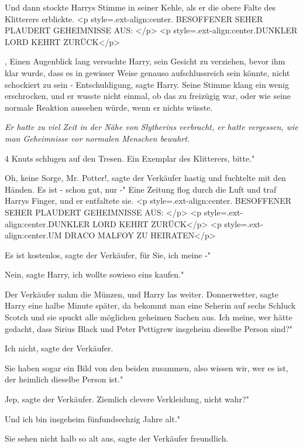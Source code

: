 Und dann stockte Harrys Stimme in seiner Kehle, als er die obere Falte des
Klitterers erblickte. <p style=\grqq{}.ext-align:center\grqq{}. BESOFFENER SEHER
PLAUDERT GEHEIMNISSE AUS: </p> <p style=\grqq{}.ext-align:center\grqq{}.DUNKLER
LORD KEHRT ZURÜCK</p>

, Einen Augenblick lang versuchte Harry, sein Gesicht zu verziehen, bevor ihm
klar wurde, dass es in gewisser Weise genauso aufschlussreich sein könnte, nicht
schockiert zu sein - \glqq Entschuldigung\grqq{}, sagte Harry. Seine Stimme
klang ein wenig erschrocken, und er wusste nicht einmal, ob das zu freizügig
war, oder wie seine normale Reaktion aussehen würde, wenn er nichts wüsste.

\emph{ Er hatte zu viel Zeit in der Nähe von Slytherins verbracht, er hatte vergessen, wie man Geheimnisse vor normalen Menschen bewahrt.}

4 Knuts schlugen auf den Tresen. \glqq Ein Exemplar des Klitterers, bitte."

\glqq Oh, keine Sorge, Mr. Potter!\grqq{}, sagte der Verkäufer hastig und
fuchtelte mit den Händen. \glqq Es ist - schon gut, nur -" Eine Zeitung flog
durch die Luft und traf Harrys Finger, und er entfaltete sie. <p
style=\grqq{}.ext-align:center\grqq{}. BESOFFENER SEHER PLAUDERT GEHEIMNISSE
AUS: </p> <p style=\grqq{}.ext-align:center\grqq{}.DUNKLER LORD KEHRT ZURÜCK</p>
<p style=\grqq{}.ext-align:center\grqq{}.UM DRACO MALFOY ZU HEIRATEN</p>

\glqq Es ist kostenlos\grqq{}, sagte der Verkäufer, \glqq für Sie, ich meine -"

\glqq Nein\grqq{}, sagte Harry, \glqq ich wollte sowieso eins kaufen."

Der Verkäufer nahm die Münzen, und Harry las weiter. \glqq Donnerwetter\grqq{},
sagte Harry eine halbe Minute später, \glqq da bekommt man eine Seherin auf
sechs Schluck Scotch und sie spuckt alle möglichen geheimen Sachen aus. Ich
meine, wer hätte gedacht, dass Sirius Black und Peter Pettigrew insgeheim
dieselbe Person sind?"

\glqq Ich nicht\grqq{}, sagte der Verkäufer.

\glqq Sie haben sogar ein Bild von den beiden zusammen, also wissen wir, wer es
ist, der heimlich dieselbe Person ist."

\glqq Jep\grqq{}, sagte der Verkäufer. \glqq Ziemlich clevere Verkleidung, nicht
wahr?"

\glqq Und ich bin insgeheim fünfundsechzig Jahre alt."

\glqq Sie sehen nicht halb so alt aus\grqq{}, sagte der Verkäufer freundlich.

